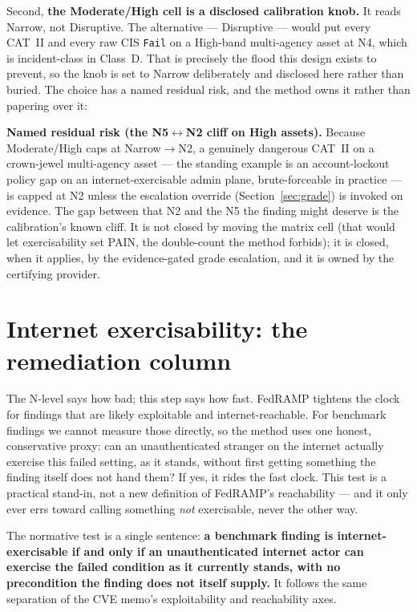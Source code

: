 \documentclass[11pt]{article}
\newcommand{\code}[1]{\texttt{#1}}
\begin{document}
Second, \textbf{the Moderate/High cell is a disclosed calibration knob.} It reads
Narrow, not Disruptive. The alternative --- Disruptive --- would put every CAT~II and
every raw CIS \code{Fail} on a High-band multi-agency asset at N4, which is
incident-class in Class~D. That is precisely the flood this design exists to prevent,
so the knob is set to Narrow deliberately and disclosed here rather than buried. The
choice has a named residual risk, and the method owns it rather than papering over it:

\begin{definitionbox}
\textbf{Named residual risk (the N5$\leftrightarrow$N2 cliff on High assets).} Because
Moderate/High caps at Narrow${}\rightarrow{}$N2, a genuinely dangerous CAT~II on a
crown-jewel multi-agency asset --- the standing example is an account-lockout policy
gap on an internet-exercisable admin plane, brute-forceable in practice --- is capped
at N2 unless the escalation override (Section~\ref{sec:grade}) is invoked on evidence.
The gap between that N2 and the N5 the finding might deserve is the calibration's
known cliff. It is not closed by moving the matrix cell (that would let exercisability
set PAIN, the double-count the method forbids); it is closed, when it applies, by the
evidence-gated grade escalation, and it is owned by the certifying provider.
\end{definitionbox}

\section{Internet exercisability: the remediation column}
\label{sec:exerc}
\begin{plain}
The N-level says how bad; this step says how fast. FedRAMP tightens the clock for
findings that are likely exploitable and internet-reachable. For benchmark findings
we cannot measure those directly, so the method uses one honest, conservative proxy:
can an unauthenticated stranger on the internet actually exercise this failed
setting, as it stands, without first getting something the finding itself does not
hand them? If yes, it rides the fast clock. This test is a practical stand-in, not a
new definition of FedRAMP's reachability --- and it only ever errs toward calling
something \emph{not} exercisable, never the other way.
\end{plain}

The normative test is a single sentence: \textbf{a benchmark finding is
internet-exercisable if and only if an unauthenticated internet actor can exercise
the failed condition as it currently stands, with no precondition the finding does
not itself supply.} It follows the same separation of the CVE memo's
exploitability and reachability axes.
\end{document}
